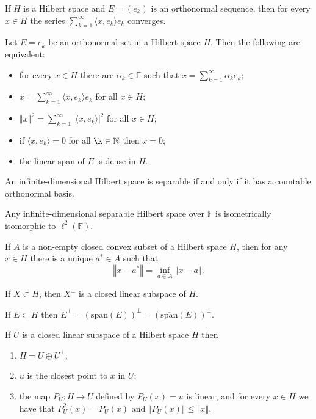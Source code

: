 \documentclass[a4paper]{article}
\newcommand{\N}{\mathbb{N}}
\newcommand{\F}{\mathbb{F}}
\newcommand{\norm}[1]{\left\Vert #1 \right\Vert}
\newcommand{\<}{\langle}
\renewcommand{\>}{\rangle}
\renewcommand{\a}{\alpha}
\renewcommand{\span}{\mathrm{span}}
\begin{document}
\begin{prop}
  If $H$ is a Hilbert space and $E = (e_k)$ is an orthonormal sequence, then for every $x\in H$ the series $\sum_{k=1}^\infty \<x,e_k\>e_k$ converges.
\end{prop}

\begin{prop}
  Let $E={e_k}$ be an orthonormal set in a Hilbert space $H$. Then the following are equivalent:
  \begin{itemize}
    \item for every $x\in H$ there are $\a_k\in\F$ such that $x = \sum_{k=1}^\infty \a_k e_k$;
    \item $x = \sum_{k=1}^\infty\<x,e_k\>e_k$ for all $x\in H$;
    \item $\norm{x}^2 = \sum_{k=1}^\infty|\<x,e_k\>|^2$ for all $x\in H$;
    \item if $\<x,e_k\>=0$ for all $\k\in\N$ then $x=0$;
    \item the linear span of $E$ is dense in $H$.
  \end{itemize}
\end{prop}

\begin{thm}
  An infinite-dimensional Hilbert space is separable if and only if it has a countable orthonormal basis.
\end{thm}

\begin{thm}
  Any infinite-dimensional separable Hilbert space over $\F$ is isometrically isomorphic to $\ell^2(\F)$.
\end{thm}

\begin{lemma}
  If $A$ is a non-empty closed convex subset of a Hilbert space $H$, then for any $x\in H$ there is a unique $a^*\in A$ such that
  $$\norm{x-a^*}=\inf_{a\in A}\norm{x-a}.$$
\end{lemma}

\begin{prop}
  If $X\subset H$, then $X^\perp$ is a closed linear subspace of $H$.
\end{prop}

\begin{prop}
  If $E\subset H$ then $E^\perp = (\span(E))^\perp = (\overline{\span}(E))^\perp$.
\end{prop}

\begin{thm}
  If $U$ is a closed linear subspace of a Hilbert space $H$ then
  \begin{enumerate}
    \item $H = U\oplus U^\perp$;
    \item $u$ is the closest point to $x$ in $U$;
    \item the map $P_U:H\to U$ defined by $P_U(x)=u$ is linear, and for every $x\in H$ we have that $P_U^2(x)=P_U(x)$ and $\norm{P_U(x)}\leq\norm{x}$.
  \end{enumerate}
\end{thm}
\end{document}
